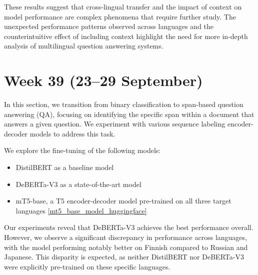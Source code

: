 \documentclass[11pt]{article}
\begin{document}
These results suggest that cross-lingual transfer and the impact of context on model performance are complex phenomena that require further study. The unexpected performance patterns observed across languages and the counterintuitive effect of including context highlight the need for more in-depth analysis of multilingual question answering systems.

\section{Week 39 (23--29 September)}
\label{sec:week39}

In this section, we transition from binary classification to span-based question answering (QA), focusing on identifying the specific span within a document that answers a given question. We experiment with various sequence labeling encoder-decoder models to address this task.

We explore the fine-tuning of the following models:
\begin{itemize}
    \item DistilBERT as a baseline model
    \item DeBERTa-V3 as a state-of-the-art model
    \item mT5-base, a T5 encoder-decoder model pre-trained on all three target languages \ref{mt5_base_model_huggingface}
\end{itemize}

Our experiments reveal that DeBERTa-V3 achieves the best performance overall. However, we observe a significant discrepancy in performance across languages, with the model performing notably better on Finnish compared to Russian and Japanese. This disparity is expected, as neither DistilBERT nor DeBERTa-V3 were explicitly pre-trained on these specific languages.
\end{document}
